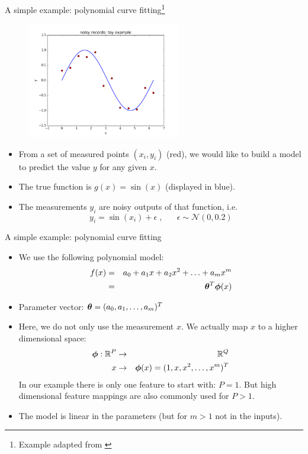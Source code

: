 \documentclass[xcolor=pdftex,dvipsnames,table]{beamer}
\begin{document}
\begin{frame}{A simple example: polynomial curve fitting\footnote{Example adapted from \cite{Bishop2006}}}
\begin{figure}[htb]
\includegraphics[width=0.6\textwidth]{../graphics/sample_from_sin.png}
\end{figure}
\begin{itemize}
	\item From a set of measured points $(x_i, y_i)$ (red), we would like to build a model to predict the value $y$ for any given $x$. 
	\item The true function is $g(x)=\sin (x)$ (displayed in blue).
	\item The measurements $y_i$ are noisy outputs of that function, i.e. 
	\begin{equation}
	y_i = \sin (x_i) + \epsilon \; , \;\;\; \;\;\; \epsilon \sim \mathcal{N}(0,0.2)
	\end{equation}
\end{itemize}
\end{frame}

\begin{frame}{A simple example: polynomial curve fitting}
\begin{itemize}
	\item We use the following polynomial model:
	\begin{eqnarray}
	f(x) &=& a_0 + a_1 x + a_2 x^2 + \ldots + a_m x^m \nonumber \\
	&=& \boldsymbol{\theta}^T \boldsymbol{\phi} (x)
	\end{eqnarray}
	\item Parameter vector: $\boldsymbol{\theta} = (a_0, a_1, \ldots, a_m)^T$
	\item Here, we do not only use the measurement $x$. We actually map $x$ to a higher dimensional space:
	\begin{eqnarray}
		\boldsymbol{\phi} : \mathbb{R}^{P} &\rightarrow & \mathbb{R}^Q \nonumber \\
		x &\rightarrow & \boldsymbol{\phi} (x) = (1, x, x^2, \ldots, x^m)^T
	\end{eqnarray}
	In our example there is only one feature to start with: $P=1$. But high dimensional feature mappings are also commonly used for $P>1$. 
	\item The model is linear in the parameters (but for $m>1$ not in the inputs). 
\end{itemize}
\end{frame}
\end{document}

